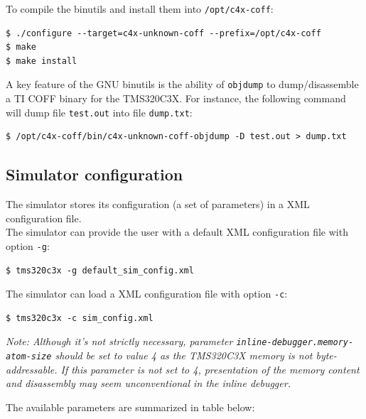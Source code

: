 To compile the binutils and install them into \texttt{/opt/c4x-coff}:

\begin{verbatim}
$ ./configure --target=c4x-unknown-coff --prefix=/opt/c4x-coff
$ make
$ make install
\end{verbatim}

A key feature of the GNU binutils is the ability of \texttt{objdump} to dump/disassemble a TI COFF binary for the TMS320C3X.
For instance, the following command will dump file \texttt{test.out} into file \texttt{dump.txt}:

\begin{verbatim}
$ /opt/c4x-coff/bin/c4x-unknown-coff-objdump -D test.out > dump.txt
\end{verbatim}

\subsection{Simulator configuration}
\label{tms320c3x_configuration}

\noindent The simulator stores its configuration (a set of parameters) in a XML configuration file. 
\newline\\
\noindent The simulator can provide the user with a default XML configuration file with option \texttt{-g}:

\begin{verbatim}
$ tms320c3x -g default_sim_config.xml
\end{verbatim}

\noindent The simulator can load a XML configuration file with option \texttt{-c}:

\begin{verbatim}
$ tms320c3x -c sim_config.xml
\end{verbatim}

\noindent \textit{Note: Although it's not strictly necessary, parameter \texttt{inline-debugger.memory-atom-size} should be set to value 4 as the TMS320C3X memory is not byte-addressable. If this parameter is not set to 4, presentation of the memory content and disassembly may seem unconventional in the inline debugger.}

\noindent The available parameters are summarized in table below:

